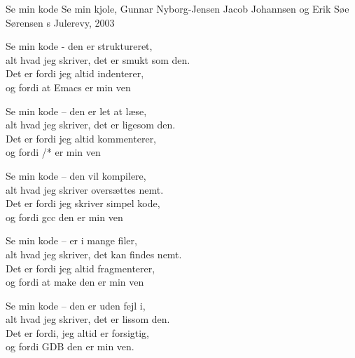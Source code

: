 \begin{song}{Se min kode}
  {} %
  {Se min kjole, Gunnar Nyborg-Jensen} %
  {Jacob Johannsen og Erik Søe Sørensen} %
  {\TKET{}s Julerevy, 2003} %
  {\NotCCLIed} %

  \begin{SBVerse}
    Se min kode - den er struktureret,\\
    alt hvad jeg skriver, det er smukt som den.\\
    Det er fordi jeg altid indenterer,\\
    og fordi at Emacs er min ven
  \end{SBVerse}

  \begin{SBVerse}
    Se min kode – den er let at læse,\\
    alt hvad jeg skriver, det er ligesom den.\\
    Det er fordi jeg altid kommenterer,\\
    og fordi /* er min ven
  \end{SBVerse}

  \begin{SBVerse}
    Se min kode – den vil kompilere,\\
    alt hvad jeg skriver oversættes nemt.\\
    Det er fordi jeg skriver simpel kode,\\
    og fordi gcc den er min ven
  \end{SBVerse}

  \begin{SBVerse}
    Se min kode – er i mange filer,\\
    alt hvad jeg skriver, det kan findes nemt.\\
    Det er fordi jeg altid fragmenterer,\\
    og fordi at make den er min ven
  \end{SBVerse}

  \begin{SBVerse}
    Se min kode – den er uden fejl i,\\
    alt hvad jeg skriver, det er lissom den.\\
    Det er fordi, jeg altid er forsigtig,\\
    og fordi GDB den er min ven.
  \end{SBVerse}


\end{song}
